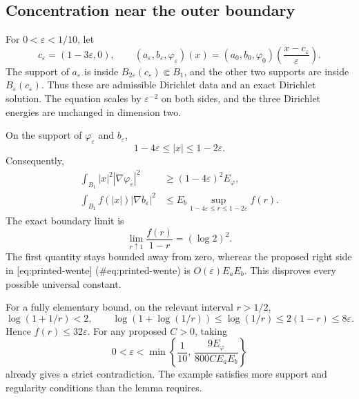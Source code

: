 \documentclass[10pt]{article}
\begin{document}
\subsection*{Concentration near the outer boundary}
For \(0<\varepsilon<1/10\), let \[c_\varepsilon=(1-3\varepsilon,0),\qquad
 (a_\varepsilon,b_\varepsilon,\varphi_\varepsilon)(x)
 =(a_0,b_0,\varphi_0)\left(\frac{x-c_\varepsilon}{\varepsilon}\right).\] The support of \(a_\varepsilon\) is inside \(B_{2\varepsilon}(c_\varepsilon)\Subset B_1\), and the other two supports are inside \(B_\varepsilon(c_\varepsilon)\). Thus these are admissible Dirichlet data and an exact Dirichlet solution. The equation scales by \(\varepsilon^{-2}\) on both sides, and the three Dirichlet energies are unchanged in dimension two.\par
On the support of \(\varphi_\varepsilon\) and \(b_\varepsilon\), \[1-4\varepsilon\le |x|\le1-2\varepsilon.\] Consequently, \[\begin{aligned}
 \int_{B_1}|x|^2|\nabla\varphi_\varepsilon|^2
   &\ge(1-4\varepsilon)^2E_\varphi,\\
 \int_{B_1} f(|x|)|\nabla b_\varepsilon|^2
   &\le E_b\sup_{1-4\varepsilon\le r\le1-2\varepsilon}f(r).\end{aligned}\] The exact boundary limit is \[\lim_{r\uparrow1}\frac{f(r)}{1-r}=(\log2)^2.\] The first quantity stays bounded away from zero, whereas the proposed right side in [eq:printed-wente] (\#eq:printed-wente) is \(O(\varepsilon)E_aE_b\). This disproves every possible universal constant.\par
For a fully elementary bound, on the relevant interval \(r>1/2\), \[\log(1+1/r)<2,\qquad
 \log(1+\log(1/r))\le\log(1/r)\le2(1-r)\le8\varepsilon.\] Hence \(f(r)\le32\varepsilon\). For any proposed \(C>0\), taking \[0<\varepsilon<
 \min\left\{\frac1{10},\,\frac{9E_\varphi}{800CE_aE_b}\right\}\] already gives a strict contradiction. The example satisfies more support and regularity conditions than the lemma requires.\par
\end{document}
